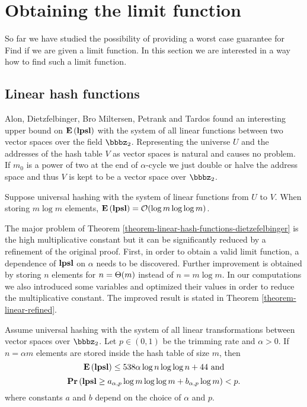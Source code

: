 \section{Obtaining the limit function}
\label{section-limit}

So far we have studied the possibility of providing a worst case guarantee for Find if we are given a limit function. 
In this section we are interested in a way how to find such a limit function.

\subsection{Linear hash functions}
Alon, Dietzfelbinger, Bro Miltersen, Petrank and Tardos \cite{DBLP:journals/jacm/AlonDMPT99} found an interesting upper bound on $\mathbf{E}\left(\mathbf{lpsl}\right)$ with the system of all linear functions between two vector spaces over the field $\bbbz_2$. 
Representing the universe $U$ and the addresses of the hash table $V$ as vector spaces is natural and causes no problem. 
If $m_0$ is a power of two at the end of $\alpha$-cycle we just double or halve the address space and thus $V$ is kept to be a vector space over $\bbbz_2$.

\begin{theorem}
\label{theorem-linear-hash-functions-dietzefelbinger}
Suppose universal hashing with the system of linear functions from $U$ to $V$. 
When storing $m \log m$ elements, $\mathbf{E}\left(\mathbf{lpsl}\right) = \mathcal{O}(\log m \log \log m)$. 
\end{theorem}

The major problem of Theorem \ref{theorem-linear-hash-functions-dietzefelbinger} is the high multiplicative constant but it can be significantly reduced by a refinement of the original proof. 
First, in order to obtain a valid limit function, a dependence of $\mathbf{lpsl}$ on $\alpha$ needs to be discovered.
Further improvement is obtained by storing $n$ elements for $n = \mathrm{\Theta}(m)$ instead of $n = m \log m$.
In our computations we also introduced some variables and optimized their values in order to reduce the multiplicative constant.
The improved result is stated in Theorem \ref{theorem-linear-refined}.

\begin{theorem}
\label{theorem-linear-refined}
Assume universal hashing with the system of all linear transformations between vector spaces over $\bbbz_2$. 
Let $p \in (0, 1)$ be the trimming rate and $\alpha > 0$. 
If $n = \alpha m$ elements are stored inside the hash table of size $m$, then $$\mathbf{E}\left(\mathbf{lpsl}\right) \leq 538 \alpha \log n \log \log n + 44\mbox{ and}$$ $$\mathbf{Pr}\left(\mathbf{lpsl} \geq a_{\alpha, p} \log m \log \log m + b_{\alpha, p}\log m\right) < p.$$ where constants $a$ and $b$ depend on the choice of $\alpha$ and $p$.
\end{theorem}

